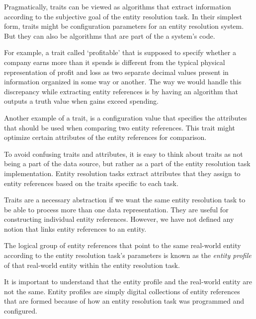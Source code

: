 \documentclass[journal]{IEEEtran}
\begin{document}
    Pragmatically, traits can be viewed as algorithms that extract information
    according to the subjective goal of the entity resolution task.
    In their simplest form, traits might be configuration parameters for an
    entity resolution system.
    But they can also be algorithms that are part of the a system's code.

    For example, a trait called `profitable' that is supposed to specify whether
    a company earns more than it spends is different from the typical physical
    representation of profit and loss as two separate decimal values present
    in information organized in some way or another.
    The way we would handle this discrepancy while extracting entity references
    is by having an algorithm that outputs a truth value when gains exceed
    spending.

    Another example of a trait, is a configuration value that specifies the
    attributes that should be used when comparing two entity references.
    This trait might optimize certain attributes of the entity references for
    comparison.
    
    To avoid confusing traits and attributes, it is easy to think about traits
    as not being a part of the data source, but rather as a part of the entity
    resolution task implementation.
    Entity resolution tasks extract attributes that they assign to entity
    references based on the traits specific to each task.

    Traits are a necessary abstraction if we want the same entity resolution
    task to be able to process more than one data representation.
    They are useful for constructing individual entity references.
    However, we have not defined any notion that links entity references to an
    entity.
    
    \begin{defn}
        The logical group of entity references that point to the same real-world
        entity according to the entity resolution task's parameters is known as
        the \textit{entity profile} of that real-world entity within the entity
        resolution task.
    \end{defn}

    It is important to understand that the entity profile and the real-world
    entity are not the same.
    Entity profiles are simply digital collections of entity references that are
    formed because of how an entity resolution task was programmed and
    configured.
    
\end{document}
